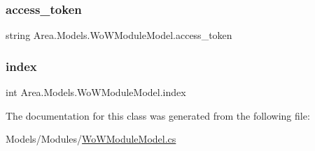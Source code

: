 \subsubsection{\texorpdfstring{access\+\_\+token}{access\_token}}
{\footnotesize\ttfamily string Area.\+Models.\+Wo\+W\+Module\+Model.\+access\+\_\+token\hspace{0.3cm}{\ttfamily [private]}}

\mbox{\label{classArea_1_1Models_1_1WoWModuleModel_aac650af907ed739ace201b3b5d616bb7}} 
\subsubsection{\texorpdfstring{index}{index}}
{\footnotesize\ttfamily int Area.\+Models.\+Wo\+W\+Module\+Model.\+index\hspace{0.3cm}{\ttfamily [private]}}



The documentation for this class was generated from the following file\+:\begin{DoxyCompactItemize}
\item 
Models/\+Modules/\mbox{\hyperlink{WoWModuleModel_8cs}{Wo\+W\+Module\+Model.\+cs}}\end{DoxyCompactItemize}

